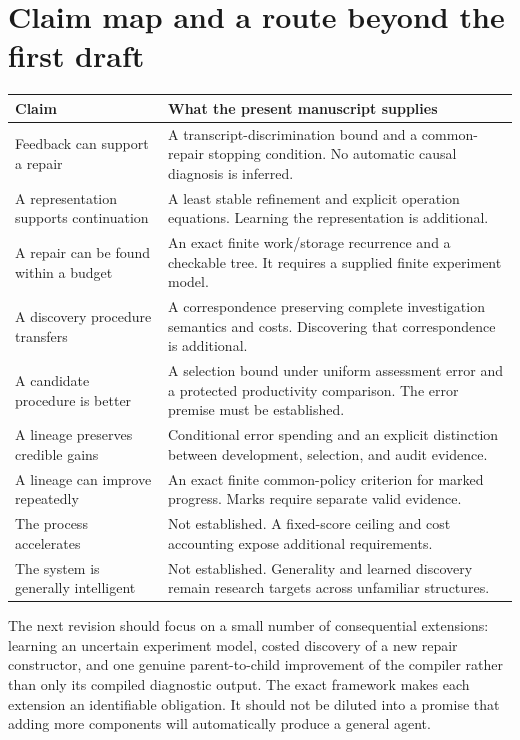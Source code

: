 \documentclass[11pt,letterpaper]{article}
\theoremstyle{plain}
\theoremstyle{definition}
\begin{document}
\section{Claim map and a route beyond the first draft}\label{app:claimmap}
\begin{small}\begin{longtable}{@{}p{}p{}@{}}\toprule
Claim & What the present manuscript supplies\\\midrule\endhead
Feedback can support a repair & A transcript-discrimination bound and a common-repair stopping condition. No automatic causal diagnosis is inferred.\\
A representation supports continuation & A least stable refinement and explicit operation equations. Learning the representation is additional.\\
A repair can be found within a budget & An exact finite work/storage recurrence and a checkable tree. It requires a supplied finite experiment model.\\
A discovery procedure transfers & A correspondence preserving complete investigation semantics and costs. Discovering that correspondence is additional.\\
A candidate procedure is better & A selection bound under uniform assessment error and a protected productivity comparison. The error premise must be established.\\
A lineage preserves credible gains & Conditional error spending and an explicit distinction between development, selection, and audit evidence.\\
A lineage can improve repeatedly & An exact finite common-policy criterion for marked progress. Marks require separate valid evidence.\\
The process accelerates & Not established. A fixed-score ceiling and cost accounting expose additional requirements.\\
The system is generally intelligent & Not established. Generality and learned discovery remain research targets across unfamiliar structures.\\\bottomrule
\end{longtable}\end{small}

The next revision should focus on a small number of consequential extensions: learning an uncertain experiment model, costed discovery of a new repair constructor, and one genuine parent-to-child improvement of the compiler rather than only its compiled diagnostic output. The exact framework makes each extension an identifiable obligation. It should not be diluted into a promise that adding more components will automatically produce a general agent.
\end{document}
